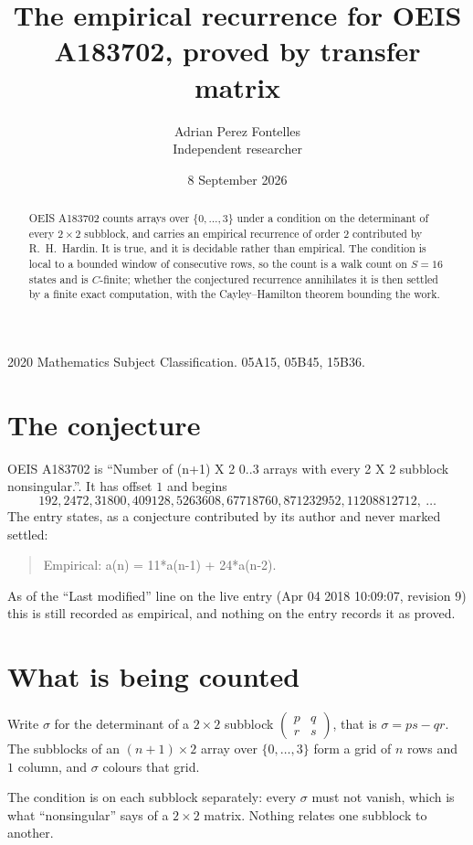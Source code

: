 \documentclass[11pt,a4paper]{article}
\title{The empirical recurrence for OEIS A183702, proved by transfer matrix}
\author{Adrian Perez Fontelles\\ \small Independent researcher}
\date{8 September 2026}
\theoremstyle{plain}
\theoremstyle{definition}
\begin{document}
\maketitle

\begin{abstract}
OEIS A183702 counts arrays over $\{0,\dots,3\}$ under a condition on the determinant of every
$2\times2$ subblock, and carries an empirical recurrence of order $2$ contributed by
R.~H.~Hardin. It is true, and it is decidable rather than empirical. The condition is local to
a bounded window of consecutive rows, so the count is a walk count on $S=16$ states and is
$C$-finite; whether the conjectured recurrence annihilates it is then settled by a finite exact
computation, with the Cayley--Hamilton theorem bounding the work.
\end{abstract}

\noindent\small 2020 Mathematics Subject Classification. 05A15, 05B45, 15B36.\normalsize

\section{The conjecture}

OEIS A183702 is ``Number of (n+1) X 2 0..3 arrays with every 2 X 2 subblock nonsingular.''. It has offset $1$ and begins
\[
192, 2472, 31800, 409128, 5263608, 67718760, 871232952, 11208812712,\ \dots
\]
The entry states, as a conjecture contributed by its author and never marked settled:
\begin{quote}
Empirical: a(n) = 11*a(n-1) + 24*a(n-2).
\end{quote}
As of the ``Last modified'' line on the live entry (Apr 04 2018 10:09:07, revision 9) this is still
recorded as empirical, and nothing on the entry records it as proved.

\section{What is being counted}

Write $\sigma$ for the determinant of a $2\times2$ subblock
$\begin{pmatrix}p&q\\r&s\end{pmatrix}$, that is $\sigma=ps-qr$. The subblocks of an
$(n+1)\times2$ array over $\{0,\dots,3\}$ form a grid of $n$ rows and $1$
column, and $\sigma$ colours that grid.

The condition is on each subblock separately: every $\sigma$ must not vanish, which is what
``nonsingular'' says of a $2\times2$ matrix. Nothing
relates one subblock to another.
\end{document}

